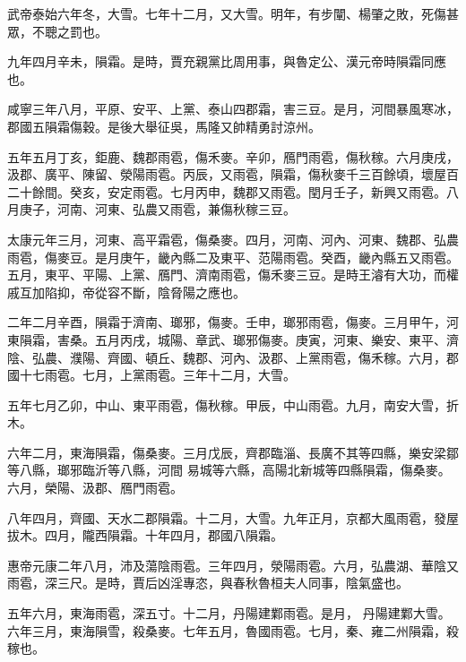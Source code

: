 \begin{pinyinscope}
 武帝泰始六年冬，大雪。七年十二月，又大雪。明年，有步闡、楊肇之敗，死傷甚眾，不聰之罰也。



 九年四月辛未，隕霜。是時，賈充親黨比周用事，與魯定公、漢元帝時隕霜同應也。



 咸寧三年八月，平原、安平、上黨、泰山四郡霜，害三豆。是月，河間暴風寒冰，郡國五隕霜傷穀。是後大舉征吳，馬隆又帥精勇討涼州。



 五年五月丁亥，鉅鹿、魏郡雨雹，傷禾麥。辛卯，鴈門雨雹，傷秋稼。六月庚戌，汲郡、廣平、陳留、滎陽雨雹。丙辰，又雨雹，隕霜，傷秋麥千三百餘頃，壞屋百二十餘間。癸亥，安定雨雹。七月丙申，魏郡又雨雹。閏月壬子，新興又雨雹。八月庚子，河南、河東、弘農又雨雹，兼傷秋稼三豆。



 太康元年三月，河東、高平霜雹，傷桑麥。四月，河南、河內、河東、魏郡、弘農雨雹，傷麥豆。是月庚午，畿內縣二及東平、范陽雨雹。癸酉，畿內縣五又雨雹。五月，東平、平陽、上黨、鴈門、濟南雨雹，傷禾麥三豆。是時王濬有大功，而權戚互加陷抑，帝從容不斷，陰脅陽之應也。



 二年二月辛酉，隕霜于濟南、瑯邪，傷麥。壬申，瑯邪雨雹，傷麥。三月甲午，河東隕霜，害桑。五月丙戌，城陽、章武、瑯邪傷麥。庚寅，河東、樂安、東平、濟陰、弘農、濮陽、齊國、頓丘、魏郡、河內、汲郡、上黨雨雹，傷禾稼。六月，郡國十七雨雹。七月，上黨雨雹。三年十二月，大雪。



 五年七月乙卯，中山、東平雨雹，傷秋稼。甲辰，中山雨雹。九月，南安大雪，折木。



 六年二月，東海隕霜，傷桑麥。三月戊辰，齊郡臨淄、長廣不其等四縣，樂安梁鄒等八縣，瑯邪臨沂等八縣，河間
 易城等六縣，高陽北新城等四縣隕霜，傷桑麥。六月，榮陽、汲郡、鴈門雨雹。



 八年四月，齊國、天水二郡隕霜。十二月，大雪。九年正月，京都大風雨雹，發屋拔木。四月，隴西隕霜。十年四月，郡國八隕霜。



 惠帝元康二年八月，沛及蕩陰雨雹。三年四月，滎陽雨雹。六月，弘農湖、華陰又雨雹，深三尺。是時，賈后凶淫專恣，與春秋魯桓夫人同事，陰氣盛也。



 五年六月，東海雨雹，深五寸。十二月，丹陽建鄴雨雹。是月，
 丹陽建鄴大雪。六年三月，東海隕雪，殺桑麥。七年五月，魯國雨雹。七月，秦、雍二州隕霜，殺稼也。




\end{pinyinscope}
